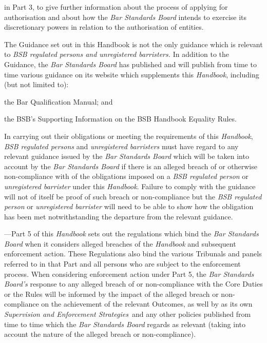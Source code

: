 \begin{numlist}
\begin{alphlist}
\begin{romlist}
\item in Part 3, to give further information about the process of applying
for authorisation and about how the \emph{Bar Standards Board} intends
to exercise its discretionary powers in relation to the authorisation of
entities.
\end{romlist}
\item The Guidance set out in this Handbook is not the only guidance which
is relevant to \emph{BSB \emph{regulated persons and unregistered
barristers}.} In addition to the Guidance, the \emph{Bar Standards
Board} has published and will publish from time to time various guidance
on its website which supplements this \emph{Handbook}, including (but
not limited to):
\begin{romlist}
\item the Bar Qualification Manual; and

\item the BSB's Supporting Information on the BSB Handbook Equality Rules.
\end{romlist}
\item In carrying out their obligations or meeting the requirements of this
\emph{Handbook}, \emph{BSB regulated persons} and \emph{unregistered
barristers} must have regard to any relevant guidance issued by the
\emph{Bar Standards Board} which will be taken into account by the
\emph{Bar Standards Board} if there is an alleged breach of or otherwise
non-compliance with of the obligations imposed on a \emph{BSB regulated
person} or \emph{unregistered barrister} under this \emph{Handbook}.
Failure to comply with the guidance will not of itself be proof of such
breach or non-compliance but the \emph{BSB regulated person} or
\emph{unregistered barrister} will need to be able to show how the
obligation has been met notwithstanding the departure from the relevant
guidance.\end{alphlist}
\item {} ---Part 5 of this \emph{Handbook} sets out the
regulations which bind the \emph{Bar Standards \emph{Board}} when it
considers alleged breaches of the \emph{Handbook} and subsequent
enforcement action. These Regulations also bind the various Tribunals
and panels referred to in that Part and all persons who are subject to
the enforcement process. When considering enforcement action under Part
5, the \emph{Bar Standards Board's} response to any alleged breach of or
non-compliance with the Core Duties or the Rules will be informed by the
impact of the alleged breach or non-compliance on the achievement of the
relevant Outcomes, as well by as its own \emph{Supervision and
Enforcement Strategies}~and any other policies published from time to
time which the \emph{Bar Standards Board} regards as relevant (taking
into account the nature of the alleged breach or non-compliance).
\end{numlist}


